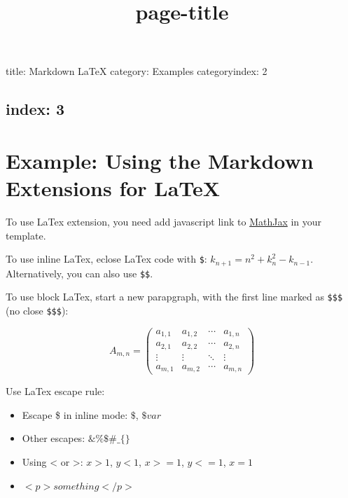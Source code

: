 \documentclass{article}
\title{{page-title}}
\date{}
\begin{document}
\maketitle

\noindent\makebox[\linewidth]{\rule{\linewidth}{0.4pt}}\medskip



title: Markdown LaTeX
category: Examples
categoryindex: 2
\subsection*{index: 3}

\section*{Example: Using the Markdown Extensions for LaTeX}



To use LaTex extension, you need add javascript
link to \href{http://www.mathjax.org/}{MathJax} in
your template.


To use inline LaTex, eclose LaTex code with \texttt{\$}:
$k_{n+1} = n^2 + k_n^2 - k_{n-1}$. Alternatively,
you can also use \texttt{\$\$}.


To use block LaTex, start a new parapgraph, with
the first line marked as \texttt{\$\$\$} (no close \texttt{\$\$\$}):


\begin{equation}
A_{m,n} =
 \begin{pmatrix}
  a_{1,1} & a_{1,2} & \cdots & a_{1,n} \\
  a_{2,1} & a_{2,2} & \cdots & a_{2,n} \\
  \vdots  & \vdots  & \ddots & \vdots  \\
  a_{m,1} & a_{m,2} & \cdots & a_{m,n}
 \end{pmatrix}
\end{equation}




Use LaTex escape rule:
\begin{itemize}
\item Escape \$ in inline mode: $\$$, $\$var$

\item Other escapes: $\& \% \$ \# \_ \{ \}$

\item Using < or >: $x > 1$, $y < 1$, $x >= 1$,
$y <= 1$, $x = 1$

\item $<p>something</p>$

\end{itemize}
\end{document}
